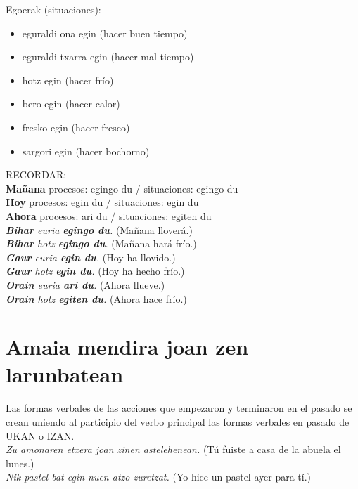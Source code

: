 \documentclass[11pt, a4paper]{article}
\begin{document}
\noindent Egoerak (situaciones):
\begin{multicols}{2}
\begin{itemize}
\item eguraldi ona egin (hacer buen tiempo)
\item eguraldi txarra egin (hacer mal tiempo)
\item hotz egin (hacer frío)
\item bero egin (hacer calor)
\item fresko egin (hacer fresco)
\item sargori egin (hacer bochorno)
\end{itemize}
\end{multicols}

\noindent RECORDAR: \\
\textbf{Mañana} procesos: egingo du / situaciones: egingo du\\
\textbf{Hoy} procesos: egin du / situaciones: egin du\\
\textbf{Ahora} procesos: ari du / situaciones: egiten du\\


\indent \textit{\textbf{Bihar} euria \textbf{egingo du}.}
(Mañana lloverá.)\\
\indent \textit{\textbf{Bihar} hotz \textbf{egingo du}.}
(Mañana hará frío.)\\
\indent \textit{\textbf{Gaur} euria \textbf{egin du}.}
(Hoy ha llovido.)\\
\indent \textit{\textbf{Gaur} hotz \textbf{egin du}.}
(Hoy ha hecho frío.)\\
\indent \textit{\textbf{Orain} euria \textbf{ari du}.}
(Ahora llueve.)\\
\indent \textit{\textbf{Orain} hotz \textbf{egiten du}.}
(Ahora hace frío.)\\

\section{Amaia mendira joan zen larunbatean}
Las formas verbales de las acciones que empezaron y terminaron en el pasado se crean uniendo al participio del verbo principal las formas verbales en pasado de UKAN o IZAN.\\
\indent \textit{Zu amonaren etxera joan zinen astelehenean.}
(Tú fuiste a casa de la abuela el lunes.)\\
\indent \textit{Nik pastel bat egin nuen atzo zuretzat.}
(Yo hice un pastel ayer para tí.)\\
\end{document}
